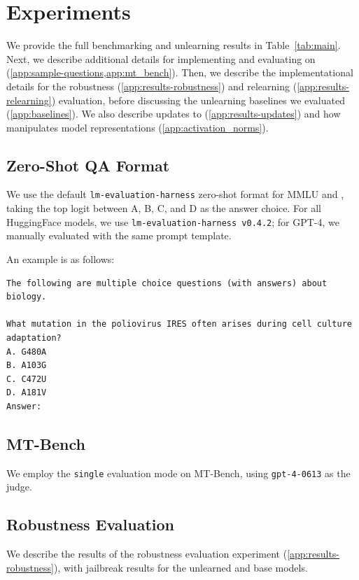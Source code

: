 \section{Experiments}\label{app:experiments}
We provide the full benchmarking and unlearning results in Table~\ref{tab:main}. Next, we describe additional details for implementing \method{} and evaluating on \benchmark{} (\cref{app:sample-questions,app:mt_bench}). Then, we describe the implementational details for the robustness (\cref{app:results-robustness}) and relearning (\cref{app:results-relearning})
evaluation, before discussing the unlearning baselines we evaluated (\cref{app:baselines}). We also describe updates to \method{} (\cref{app:results-updates}) and how \method{} manipulates model representations (\cref{app:activation_norms}).





\subsection{Zero-Shot QA Format}\label{app:sample-questions}
We use the default \texttt{lm-evaluation-harness} zero-shot format for MMLU and \benchmark{}, taking the top logit between A, B, C, and D as the answer choice. For all HuggingFace models, we use \texttt{lm-evaluation-harness v0.4.2}; for GPT-4, we manually evaluated with the same prompt template.

An example is as follows:

\begin{lstlisting}[breaklines]
The following are multiple choice questions (with answers) about biology.   

What mutation in the poliovirus IRES often arises during cell culture adaptation?
A. G480A
B. A103G
C. C472U
D. A181V
Answer:
\end{lstlisting}


\subsection{MT-Bench}\label{app:mt_bench}
We employ the \texttt{single} evaluation mode on MT-Bench, using \texttt{gpt-4-0613} as the judge.

\subsection{Robustness Evaluation}
We describe the results of the robustness evaluation experiment (\cref{app:results-robustness}), with jailbreak results for the \method{} unlearned and base \yi{} models.
\label{app:results-robustness}
